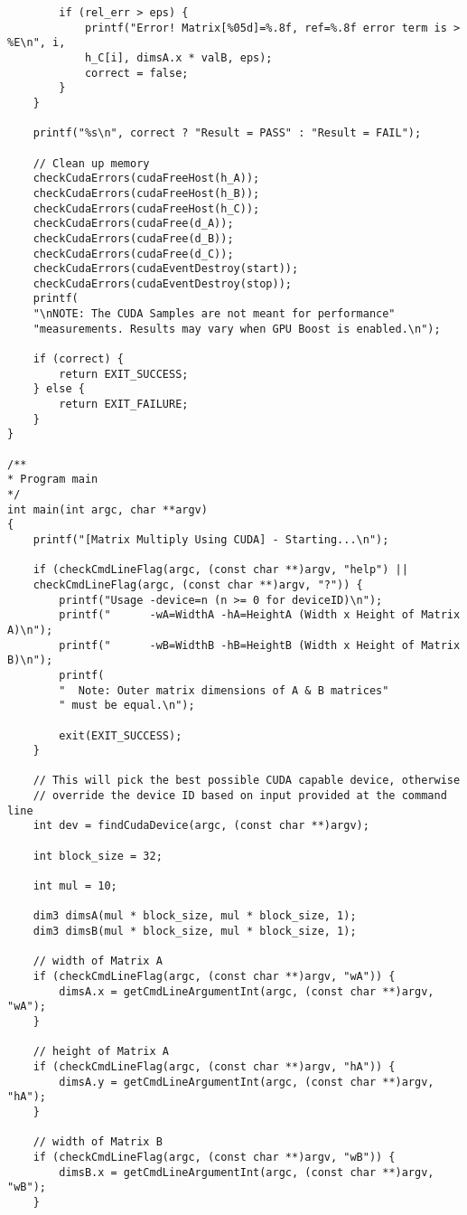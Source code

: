\begin{lstlisting}
		if (rel_err > eps) {
			printf("Error! Matrix[%05d]=%.8f, ref=%.8f error term is > %E\n", i,
			h_C[i], dimsA.x * valB, eps);
			correct = false;
		}
	}
	
	printf("%s\n", correct ? "Result = PASS" : "Result = FAIL");
	
	// Clean up memory
	checkCudaErrors(cudaFreeHost(h_A));
	checkCudaErrors(cudaFreeHost(h_B));
	checkCudaErrors(cudaFreeHost(h_C));
	checkCudaErrors(cudaFree(d_A));
	checkCudaErrors(cudaFree(d_B));
	checkCudaErrors(cudaFree(d_C));
	checkCudaErrors(cudaEventDestroy(start));
	checkCudaErrors(cudaEventDestroy(stop));
	printf(
	"\nNOTE: The CUDA Samples are not meant for performance"
	"measurements. Results may vary when GPU Boost is enabled.\n");
	
	if (correct) {
		return EXIT_SUCCESS;
	} else {
		return EXIT_FAILURE;
	}
}

/**
* Program main
*/
int main(int argc, char **argv)
{
	printf("[Matrix Multiply Using CUDA] - Starting...\n");
	
	if (checkCmdLineFlag(argc, (const char **)argv, "help") ||
	checkCmdLineFlag(argc, (const char **)argv, "?")) {
		printf("Usage -device=n (n >= 0 for deviceID)\n");
		printf("      -wA=WidthA -hA=HeightA (Width x Height of Matrix A)\n");
		printf("      -wB=WidthB -hB=HeightB (Width x Height of Matrix B)\n");
		printf(
		"  Note: Outer matrix dimensions of A & B matrices"
		" must be equal.\n");
		
		exit(EXIT_SUCCESS);
	}
	
	// This will pick the best possible CUDA capable device, otherwise
	// override the device ID based on input provided at the command line
	int dev = findCudaDevice(argc, (const char **)argv);
	
	int block_size = 32;
	
	int mul = 10;
	
	dim3 dimsA(mul * block_size, mul * block_size, 1);
	dim3 dimsB(mul * block_size, mul * block_size, 1);
	
	// width of Matrix A
	if (checkCmdLineFlag(argc, (const char **)argv, "wA")) {
		dimsA.x = getCmdLineArgumentInt(argc, (const char **)argv, "wA");
	}
	
	// height of Matrix A
	if (checkCmdLineFlag(argc, (const char **)argv, "hA")) {
		dimsA.y = getCmdLineArgumentInt(argc, (const char **)argv, "hA");
	}
	
	// width of Matrix B
	if (checkCmdLineFlag(argc, (const char **)argv, "wB")) {
		dimsB.x = getCmdLineArgumentInt(argc, (const char **)argv, "wB");
	}
	

\end{lstlisting}
